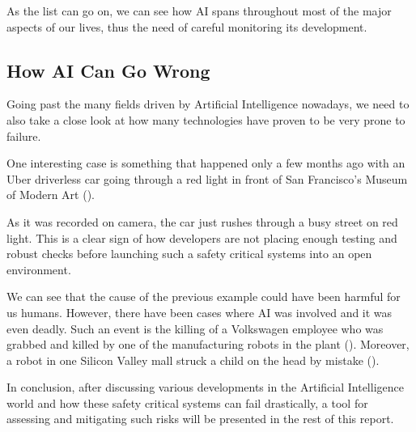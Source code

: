 \documentclass[paper=a4, fontsize=11pt]{scrartcl} %
\numberwithin{equation}{section} %
\numberwithin{figure}{section} %
\numberwithin{table}{section} %
\begin{document}
\par
As the list can go on, we can see how AI spans throughout most of the major aspects of our lives, thus the need of careful monitoring its development.


\subsection{How AI Can Go Wrong}

\par
Going past the many fields driven by Artificial Intelligence nowadays, we need to also take a close look at how many technologies have proven to be very prone to failure. \\

\par
One interesting case is something that happened only a few months ago with an Uber driverless car going through a red light in front of San Francisco's Museum of Modern Art (\cite{uber-red-light}).

\par
As it was recorded on camera, the car just rushes through a busy street on red light. This is a clear sign of how developers are not placing enough testing and robust checks before launching such a safety critical systems into an open environment. \\

\par
We can see that the cause of the previous example could have been harmful for us humans. However, there have been cases where AI was involved and it was even deadly. Such an event is the killing of a Volkswagen employee who was grabbed and killed by one of the manufacturing robots in the plant (\cite{volkswagen}). Moreover, a robot in one Silicon Valley mall struck a child on the head by mistake (\cite{knightscope}). \\

\par
In conclusion, after discussing various developments in the Artificial Intelligence world and how these safety critical systems can fail drastically, a tool for assessing and mitigating such risks will be presented in the rest of this report.

\end{document}
